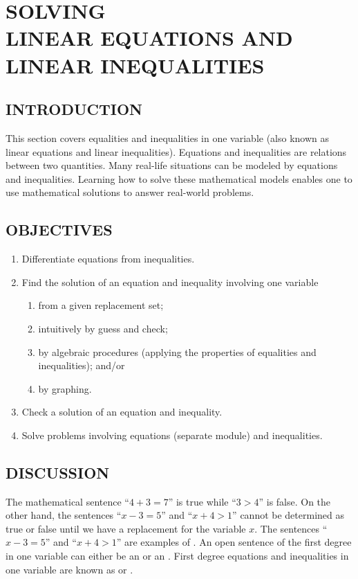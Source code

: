 \chapter[SOLVING LINEAR EQUATIONS AND LINEAR INEQUALITIES]{SOLVING\\ LINEAR EQUATIONS AND\\ LINEAR INEQUALITIES}
\section*{INTRODUCTION}
This section covers equalities and inequalities in one variable (also known as linear equations
and linear inequalities). Equations and inequalities are relations between two quantities. Many real-life situations can be modeled by equations and inequalities. Learning how to solve these
mathematical models enables one to use mathematical solutions to answer real-world problems.
\section*{OBJECTIVES}
\begin{enumerate}
\item Differentiate equations from inequalities.
\item Find the solution of an equation and inequality involving one variable
\begin{enumerate}
	\item from a given replacement set;
	\item intuitively by guess and check;
	\item by algebraic procedures (applying the properties of equalities and inequalities); and/or
	\item by graphing.
\end{enumerate}
\item Check a solution of an equation and inequality.
\item Solve problems involving equations (separate module) and inequalities.
\end{enumerate}
\section*{DISCUSSION}
The mathematical sentence “$4 + 3 = 7$” is true while “$3 > 4$” is false. On the other hand, the
sentences “$x - 3 = 5$” and “$x + 4 > 1$” cannot be determined as true or false until we have a
replacement for the variable $x$. The sentences “$x - 3 = 5$” and “$x + 4 > 1$” are examples of . An open sentence of the first degree in one variable can either be an  or an
. First degree equations and inequalities in one variable are known as  or
.

